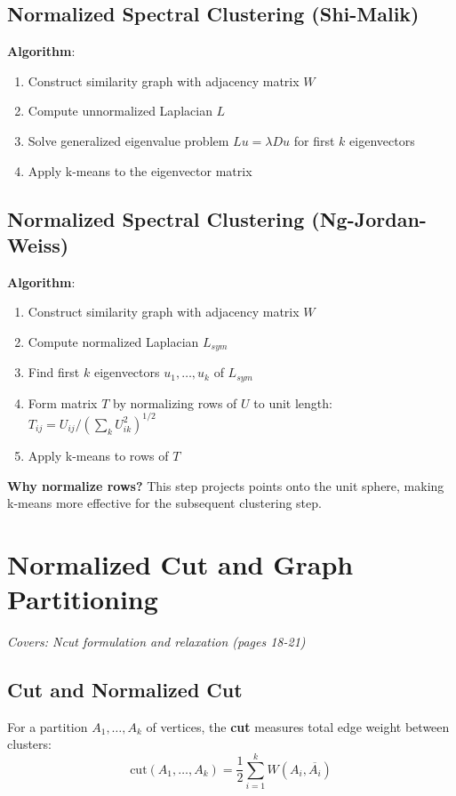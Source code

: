 \documentclass[11pt]{article}
\begin{document}
\subsection{Normalized Spectral Clustering (Shi-Malik)}
\textbf{Algorithm}:
\begin{enumerate}
\item Construct similarity graph with adjacency matrix $W$
\item Compute unnormalized Laplacian $L$
\item Solve generalized eigenvalue problem $Lu = \lambda Du$ for first $k$ eigenvectors
\item Apply k-means to the eigenvector matrix
\end{enumerate}

\subsection{Normalized Spectral Clustering (Ng-Jordan-Weiss)}
\textbf{Algorithm}:
\begin{enumerate}
\item Construct similarity graph with adjacency matrix $W$
\item Compute normalized Laplacian $L_{sym}$
\item Find first $k$ eigenvectors $u_1, \ldots, u_k$ of $L_{sym}$
\item Form matrix $T$ by normalizing rows of $U$ to unit length: $T_{ij} = U_{ij}/(\sum_k U_{ik}^2)^{1/2}$
\item Apply k-means to rows of $T$
\end{enumerate}

\textbf{Why normalize rows?} This step projects points onto the unit sphere, making k-means more effective for the subsequent clustering step.

\section{Normalized Cut and Graph Partitioning}
\textit{Covers: Ncut formulation and relaxation (pages 18-21)}

\subsection{Cut and Normalized Cut}
For a partition $A_1, \ldots, A_k$ of vertices, the \textbf{cut} measures total edge weight between clusters:
$$\text{cut}(A_1, \ldots, A_k) = \frac{1}{2}\sum_{i=1}^k W(A_i, \overline{A_i})$$
\end{document}
